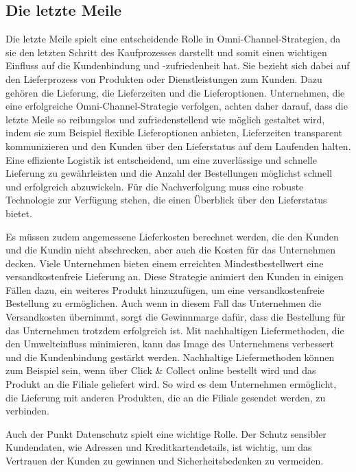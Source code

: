 \subsection{Die letzte Meile}\label{unterabschnitt_3_8}
Die letzte Meile spielt eine entscheidende Rolle in Omni-Channel-Strategien, da sie den letzten Schritt des Kaufprozesses darstellt und somit einen wichtigen Einfluss auf die Kundenbindung und -zufriedenheit hat. Sie bezieht sich dabei auf den Lieferprozess von Produkten oder Dienstleistungen zum Kunden. Dazu gehören die Lieferung, die Lieferzeiten und die Lieferoptionen. Unternehmen, die eine erfolgreiche Omni-Channel-Strategie verfolgen, achten daher darauf, dass die letzte Meile so reibungslos und zufriedenstellend wie möglich gestaltet wird, indem sie zum Beispiel flexible Lieferoptionen anbieten, Lieferzeiten transparent kommunizieren und den Kunden über den Lieferstatus auf dem Laufenden halten. Eine effiziente Logistik ist entscheidend, um eine zuverlässige und schnelle Lieferung zu gewährleisten und die Anzahl der Bestellungen möglichst schnell und erfolgreich abzuwickeln. Für die Nachverfolgung muss eine robuste Technologie zur Verfügung stehen, die einen Überblick über den Lieferstatus bietet.
\newline

Es müssen zudem angemessene Lieferkosten berechnet werden, die den Kunden und die Kundin nicht abschrecken, aber auch die Kosten für das Unternehmen decken. Viele Unternehmen bieten einem erreichten Mindestbestellwert eine versandkostenfreie Lieferung an. Diese Strategie animiert den Kunden in einigen Fällen dazu, ein weiteres Produkt hinzuzufügen, um eine versandkostenfreie Bestellung zu ermöglichen. Auch wenn in diesem Fall das Unternehmen die Versandkosten übernimmt,  sorgt die Gewinnmarge dafür, dass die Bestellung für das Unternehmen trotzdem erfolgreich ist. Mit nachhaltigen Liefermethoden, die den Umwelteinfluss minimieren, kann das Image des Unternehmens verbessert und die Kundenbindung gestärkt werden. Nachhaltige Liefermethoden können zum Beispiel sein, wenn über Click \& Collect online bestellt wird und das Produkt an die Filiale geliefert wird. So wird es dem Unternehmen ermöglicht, die Lieferung mit anderen Produkten, die an die Filiale gesendet werden, zu verbinden.
\newline

Auch der Punkt Datenschutz spielt eine wichtige Rolle. Der Schutz sensibler Kundendaten, wie Adressen und Kreditkartendetails, ist wichtig, um das Vertrauen der Kunden zu gewinnen und Sicherheitsbedenken zu vermeiden.
\newline

